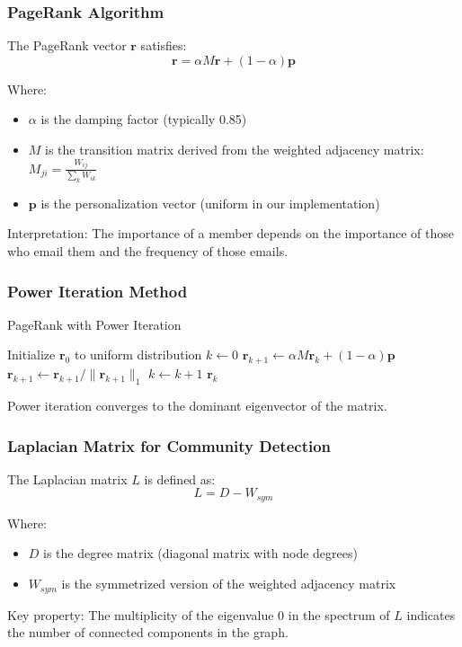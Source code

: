 \documentclass{beamer}
\begin{document}
\begin{frame}
    \frametitle{PageRank Algorithm}
    The PageRank vector $\mathbf{r}$ satisfies:
    \begin{equation}
        \mathbf{r} = \alpha M\mathbf{r} + (1-\alpha)\mathbf{p}
    \end{equation}
    
    Where:
    \begin{itemize}
        \item $\alpha$ is the damping factor (typically 0.85)
        \item $M$ is the transition matrix derived from the weighted adjacency matrix:
        $M_{ji} = \frac{W_{ij}}{\sum_k W_{ik}}$
        \item $\mathbf{p}$ is the personalization vector (uniform in our implementation)
    \end{itemize}
    
    Interpretation: The importance of a member depends on the importance of those who email them and the frequency of those emails.
\end{frame}

\begin{frame}
    \frametitle{Power Iteration Method}
    \begin{algorithm}[H]
    \caption{PageRank with Power Iteration}
    \begin{algorithmic}
    \STATE Initialize $\mathbf{r}_0$ to uniform distribution
    \STATE $k \gets 0$
        \STATE $\mathbf{r}_{k+1} \gets \alpha M \mathbf{r}_k + (1-\alpha)\mathbf{p}$
        \STATE $\mathbf{r}_{k+1} \gets \mathbf{r}_{k+1} / \|\mathbf{r}_{k+1}\|_1$
        \STATE $k \gets k + 1$
    \ENDWHILE
    \RETURN $\mathbf{r}_k$
    \end{algorithmic}
    \end{algorithm}
    
    Power iteration converges to the dominant eigenvector of the matrix.
\end{frame}

\begin{frame}
    \frametitle{Laplacian Matrix for Community Detection}
    The Laplacian matrix $L$ is defined as:
    \begin{equation}
        L = D - W_{sym}
    \end{equation}
    
    Where:
    \begin{itemize}
        \item $D$ is the degree matrix (diagonal matrix with node degrees)
        \item $W_{sym}$ is the symmetrized version of the weighted adjacency matrix
    \end{itemize}
    
    Key property: The multiplicity of the eigenvalue 0 in the spectrum of $L$ indicates the number of connected components in the graph.
\end{frame}
\end{document}
